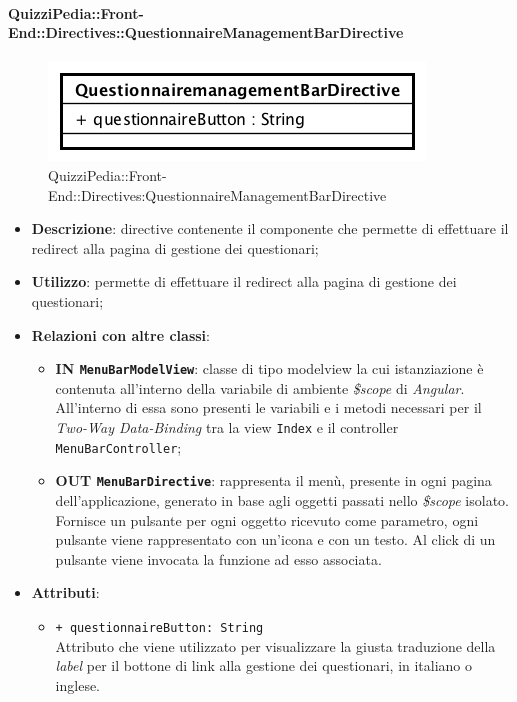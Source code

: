 \paragraph{QuizziPedia::Front-End::Directives::QuestionnaireManagementBarDirective}

\label{QuizziPedia::Front-End::Directives::QuestionnaireManagementBarDirective}
\begin{figure} [ht]
	\centering
	\includegraphics[scale=0.80]{UML/Classi/Front-End/QuizziPedia_Front-end_Directives_QuestionnaireManagementBarDirective.png}
	\caption{QuizziPedia::Front-End::Directives:QuestionnaireManagementBarDirective}
\end{figure} \FloatBarrier
\begin{itemize}
	\item \textbf{Descrizione}: directive contenente il componente che permette di effettuare il redirect alla pagina di gestione dei questionari;
	\item \textbf{Utilizzo}: permette di effettuare il redirect alla pagina di gestione dei questionari;
	\item \textbf{Relazioni con altre classi}:
	\begin{itemize}
		\item \textbf{IN \texttt{MenuBarModelView}}: classe di tipo modelview la cui istanziazione è contenuta all'interno della variabile di ambiente \textit{\$scope} di \textit{Angular}. All'interno di essa sono presenti le variabili e i metodi necessari per il \textit{Two-Way Data-Binding} tra la view \texttt{Index} e il controller \texttt{MenuBarController};
		\item \textbf{OUT \texttt{MenuBarDirective}}: rappresenta il menù, presente in ogni pagina dell'applicazione, generato in base agli oggetti passati nello \textit{\$scope} isolato. Fornisce un pulsante per ogni oggetto ricevuto come parametro, ogni pulsante viene rappresentato con un’icona e con un testo. Al click di un pulsante viene invocata la funzione ad esso associata.  
	\end{itemize}
	\item \textbf{Attributi}:
	\begin{itemize}
		\item \texttt{+ questionnaireButton: String} \\ Attributo che viene utilizzato per visualizzare la giusta traduzione della \textit{label} per il bottone di link alla gestione dei questionari, in italiano o inglese.
	\end{itemize}
\end{itemize}